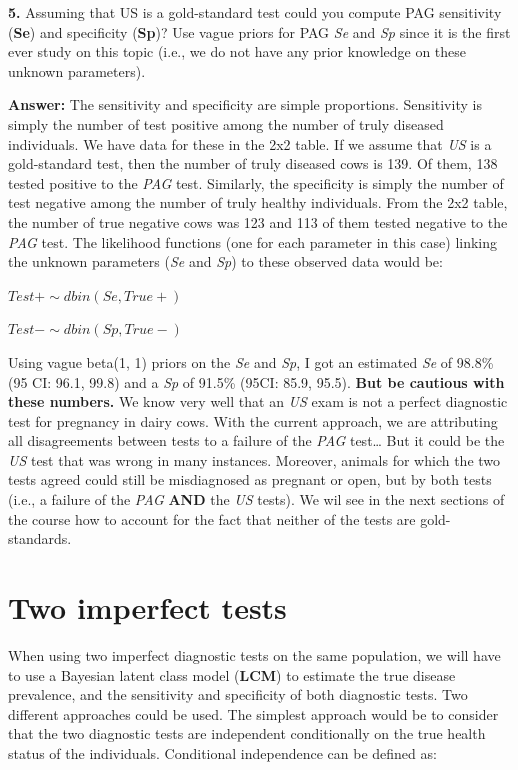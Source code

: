 \documentclass[
]{book}
\begin{document}
\textbf{5.} Assuming that US is a gold-standard test could you compute PAG sensitivity (\textbf{Se}) and specificity (\textbf{Sp})? Use vague priors for PAG \emph{Se} and \emph{Sp} since it is the first ever study on this topic (i.e., we do not have any prior knowledge on these unknown parameters).

\textbf{Answer:} The sensitivity and specificity are simple proportions. Sensitivity is simply the number of test positive among the number of truly diseased individuals. We have data for these in the 2x2 table. If we assume that \emph{US} is a gold-standard test, then the number of truly diseased cows is 139. Of them, 138 tested positive to the \emph{PAG} test. Similarly, the specificity is simply the number of test negative among the number of truly healthy individuals. From the 2x2 table, the number of true negative cows was 123 and 113 of them tested negative to the \emph{PAG} test. The likelihood functions (one for each parameter in this case) linking the unknown parameters (\emph{Se} and \emph{Sp}) to these observed data would be:

\(Test+ \sim dbin(Se, True+)\)

\(Test- \sim dbin(Sp, True-)\)

Using vague beta(1, 1) priors on the \emph{Se} and \emph{Sp}, I got an estimated \emph{Se} of 98.8\% (95 CI: 96.1, 99.8) and a \emph{Sp} of 91.5\% (95CI: 85.9, 95.5). \textbf{But be cautious with these numbers.} We know very well that an \emph{US} exam is not a perfect diagnostic test for pregnancy in dairy cows. With the current approach, we are attributing all disagreements between tests to a failure of the \emph{PAG} test\ldots{} But it could be the \emph{US} test that was wrong in many instances. Moreover, animals for which the two tests agreed could still be misdiagnosed as pregnant or open, but by both tests (i.e., a failure of the \emph{PAG} \textbf{AND} the \emph{US} tests). We wil see in the next sections of the course how to account for the fact that neither of the tests are gold-standards.

\chapter{Two imperfect tests}\label{two-imperfect-tests}

When using two imperfect diagnostic tests on the same population, we will have to use a Bayesian latent class model (\textbf{LCM}) to estimate the true disease prevalence, and the sensitivity and specificity of both diagnostic tests. Two different approaches could be used. The simplest approach would be to consider that the two diagnostic tests are independent conditionally on the true health status of the individuals. Conditional independence can be defined as:
\end{document}
